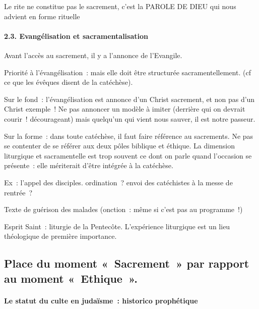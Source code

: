 Le rite ne constitue pas le sacrement, c'est la PAROLE DE DIEU qui nous
advient en forme rituelle

\hypertarget{evanguxe9lisation-et-sacramentalisation}{%
\paragraph{2.3. Evangélisation et
sacramentalisation}\label{evanguxe9lisation-et-sacramentalisation}}

Avant l'accès au sacrement, il y a l'annonce de l'Evangile.

Priorité à l'évangélisation~: mais elle doit être structurée
sacramentellement. (cf ce que les évêques disent de la catéchèse).~

Sur le fond~: l'évangélisation est annonce d'un Christ sacrement, et non
pas d'un Christ exemple~! Ne pas annoncer un modèle à imiter (derrière
qui on devrait courir~! décourageant) mais quelqu'un qui vient nous
sauver, il est notre passeur.

Sur la forme~: dans toute catéchèse, il faut faire référence au
sacrements. Ne pas se contenter de se référer aux deux pôles biblique et
éthique. La dimension liturgique et sacramentelle est trop souvent ce
dont on parle quand l'occasion se présente~: elle mériterait d'être
intégrée à la catéchèse.

Ex~: l'appel des disciples. ordination~? envoi des catéchistes à la
messe de rentrée~?

Texte de guérison des malades (onction~: même si c'est pas au
programme~!)

Esprit Saint~: liturgie de la Pentecôte. L'expérience liturgique est un
lieu théologique de première importance.

\hypertarget{place-du-moment-sacrement-par-rapport-au-moment-ethique-.}{%
\subsection{Place du moment «~Sacrement~» par rapport au moment
«~Ethique~».}\label{place-du-moment-sacrement-par-rapport-au-moment-ethique-.}}

\hypertarget{le-statut-du-culte-en-judauxefsme-historico-prophuxe9tique}{%
\paragraph{Le statut du culte en judaïsme~: historico
prophétique}\label{le-statut-du-culte-en-judauxefsme-historico-prophuxe9tique}}

